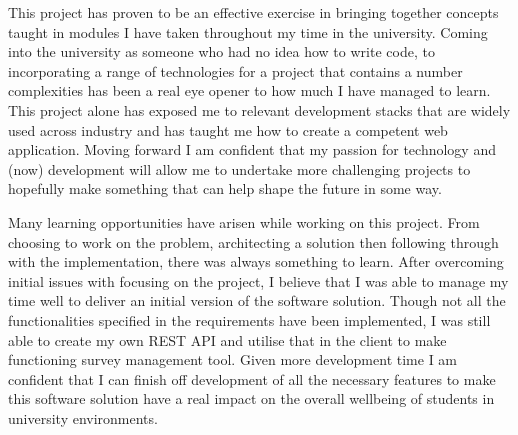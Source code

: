 This project has proven to be an effective exercise in bringing together concepts taught in modules I have taken throughout my time in the university.
Coming into the university as someone who had no idea how to write code, to incorporating a range of technologies for a project that contains a number 
complexities has been a real eye opener to how much I have managed to learn.
This project alone has exposed me to relevant development stacks that are widely used across industry and has taught me how to create a competent 
web application.
Moving forward I am confident that my passion for technology and (now) development will allow me to undertake more challenging projects to hopefully
make something that can help shape the future in some way.

Many learning opportunities have arisen while working on this project.
From choosing to work on the problem, architecting a solution then following through with the implementation, there was always something to learn.
After overcoming initial issues with focusing on the project, I believe that I was able to manage my time well to deliver an initial version of the
software solution.
Though not all the functionalities specified in the requirements have been implemented, I was still able to create my own REST API and utilise that 
in the client to make functioning survey management tool.
Given more development time I am confident that I can finish off development of all the necessary features to make this software solution have a real 
impact on the overall wellbeing of students in university environments.